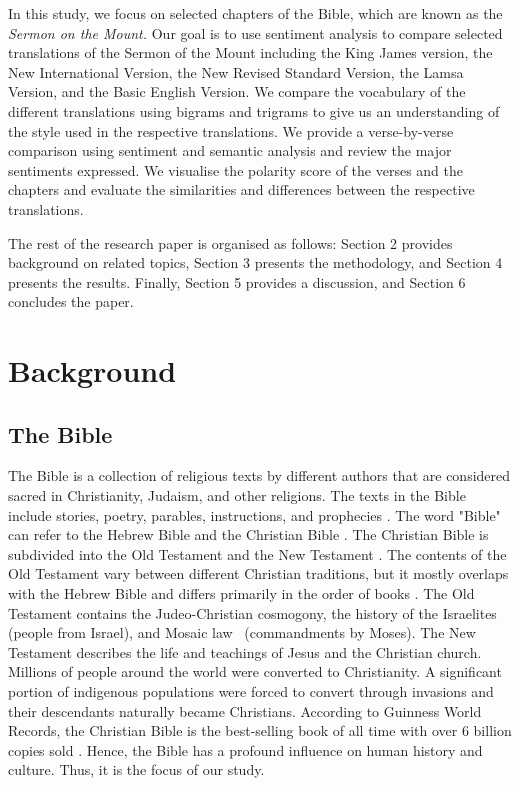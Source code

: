 \documentclass[5p,times]{elsarticle}
\begin{document}
In this study, we focus on selected chapters of the  Bible, which are known as the \textit{Sermon on the Mount.} Our goal is to use sentiment analysis to compare selected translations of the Sermon of the Mount including the King James version, the New International Version, the New Revised Standard Version,  the Lamsa Version, and the Basic English Version. We compare the vocabulary of the different translations using bigrams and trigrams to give us an understanding of the style used in the respective translations. 
 We provide a verse-by-verse comparison using sentiment and semantic analysis and review the major sentiments expressed. We visualise the polarity score of the verses and the chapters and evaluate the similarities and differences between the respective translations. 




 The rest of the research paper is organised as follows: Section 2 provides background on related topics, Section 3 presents the methodology, and  Section 4 presents the results. Finally, Section 5 provides a discussion, and Section 6 concludes the paper.  


 \section{Background} 
 
 \subsection{The Bible} 

 The Bible is a collection of religious texts by different authors that are considered sacred in Christianity, Judaism, and other religions. The texts in the Bible include stories, poetry, parables, instructions, and prophecies \cite{levenson1993hebrew,moorey1991century,young1999biblical}. The word "Bible" can refer to the Hebrew Bible \cite{} and the  Christian Bible \cite{}. The Christian Bible is subdivided into the Old Testament \cite{} and the New Testament \cite{}. The contents of the Old Testament vary between different Christian traditions, but it mostly overlaps with the Hebrew Bible and differs primarily in the order of books \cite{}. The Old Testament contains the Judeo-Christian cosmogony, the history of the Israelites (people from Israel), and Mosaic law~\cite{lightner1911mosaic} (commandments by Moses). The New Testament describes the life and teachings of Jesus and the Christian church. Millions of people around the world were converted to Christianity. A significant portion of indigenous populations  were forced to convert through invasions \cite {forcedconversions} and their descendants naturally became Christians. According to Guinness World Records, the Christian Bible is the best-selling book of all time with over 6 billion copies sold \cite{guinness}. Hence, the Bible has a profound influence on human history and culture. Thus, it is the focus of our study. 
 
\end{document}
